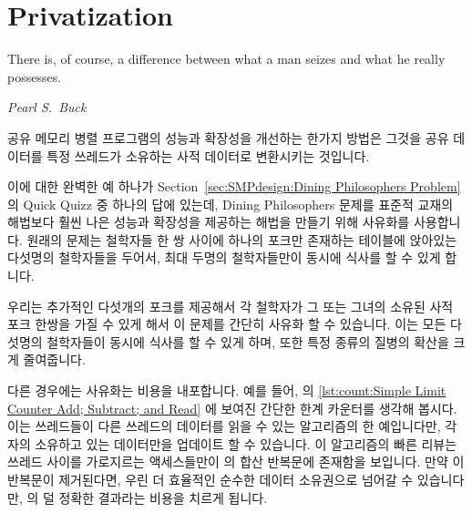 \section{Privatization}
\label{sec:owned:Privatization}
%
\epigraph{There is, of course, a difference between what a man seizes
	  and what he really possesses.}
	 {\emph{Pearl S.~Buck}}

공유 메모리 병렬 프로그램의 성능과 확장성을 개선하는 한가지 방법은 그것을 공유
데이터를 특정 쓰레드가 소유하는 사적 데이터로 변환시키는 것입니다.

이에 대한 완벽한 예 하나가
Section~\ref{sec:SMPdesign:Dining Philosophers Problem} 의 Quick Quizz 중
하나의 답에 있는데, Dining Philosophers 문제를 표준적 교재의 해법보다 훨씬 나은
성능과 확장성을 제공하는 해법을 만들기 위해 사유화를 사용합니다.
원래의 문제는 철학자들 한 쌍 사이에 하나의 포크만 존재하는 테이블에 앉아있는
다섯명의 철학자들을 두어서, 최대 두명의 철학자들만이 동시에 식사를 할 수 있게
합니다.

우리는 추가적인 다섯개의 포크를 제공해서 각 철학자가 그 또는 그녀의 소유된 사적
포크 한쌍을 가질 수 있게 해서 이 문제를 간단히 사유화 할 수 있습니다.
이는 모든 다섯명의 철학자들이 동시에 식사를 할 수 있게 하며, 또한 특정 종류의
질병의 확산을 크게 줄여줍니다.

\iffalse

One way of improving the performance and scalability of a shared-memory
parallel program is to transform it so as to convert shared data to
private data that is owned by a particular thread.

An excellent example of this is shown in the answer to one of the
Quick Quizzes in
Section~\ref{sec:SMPdesign:Dining Philosophers Problem},
which uses privatization to produce a solution to the
Dining Philosophers problem with much better performance and scalability
than that of the standard textbook solution.
The original problem has five philosophers sitting around the table
with one fork between each adjacent pair of philosophers, which permits
at most two philosophers to eat concurrently.

We can trivially privatize this problem by providing an additional five
forks, so that each philosopher has his or her own private pair of forks.
This allows all five philosophers to eat concurrently, and also offers
a considerable reduction in the spread of certain types of disease.

\fi

다른 경우에는 사유화는 비용을 내포합니다.
예를 들어,
의
\cref{lst:count:Simple Limit Counter Add; Subtract; and Read} 에 보여진 간단한
한계 카운터를 생각해 봅시다.
이는 쓰레드들이 다른 쓰레드의 데이터를 읽을 수 있는 알고리즘의 한 예입니다만,
각자의 소유하고 있는 데이터만을 업데이트 할 수 있습니다.
이 알고리즘의 빠른 리뷰는 쓰레드 사이를 가로지르는 액세스들만이
 의 합산 반복문에 존재함을 보입니다.
만약 이 반복문이 제거된다면, 우린 더 효율적인 순수한 데이터 소유권으로 넘어갈
수 있습니다만,  의 덜 정확한 결과라는 비용을 치르게 됩니다.

